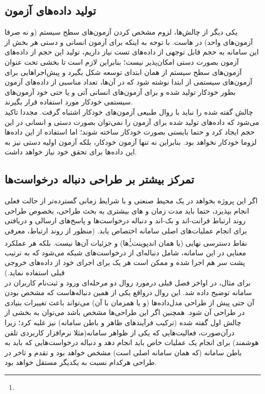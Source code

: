 \subsection{تولید داده‌های آزمون}

یکی دیگر از چالش‌ها، لزوم مشخص کردن آزمون‌های سطح سیستم (و نه صرفا آزمون‌های واحد) در هاست. با توجه به اینکه برای آزمون انسانی و دستی هر بخش از این سامانه به حجم قابل توجهی از داده‌های تست نیاز داریم، تولید این حجم از داده‌های آزمون بصورت دستی امکان‌پذیر نیست؛ بنابراین لازم است تا بخشی تحت عنوان آزمون‌های سطح سیستم از همان ابتدای توسعه شکل بگیرد و پیش‌اجراهایی برای آزمون‌های سیستمی از ابتدا نوشته شود که در آن‌ها، تعداد مناسبی از داده‌های آزمون بطور خودکار تولید شده و برای آزمون‌های انسانی آتی و یا حتی خود آزمون‌های سیستمی خودکار مورد استفاده قرار بگیرند.\\

چالش گفته شده را نباید با روال طبیعی آزمون‌های خودکار اشتباه گرفت. مجددا تاکید می‌شود که داده‌های تولید شده برای آزمون را نمی‌توان بصورت دستی و انسانی در این حجم ایجاد کرد و حتما بایستی بصورت خودکار ساخته شوند؛ اما استفاده از این داده‌ها لزوما خودکار نخواهد بود. بنابراین نه تنها آزمون خودکار، بلکه آزمون اولیه دستی نیز به این داده‌ها برای تحقق خود نیاز خواهد داشت.\\

\newpage

\subsection{تمرکز بیشتر بر طراحی دنباله درخواست‌ها}

اگر این پروژه بخواهد در یک محیط صنعتی و با شرایط زمانی گسترده‌تر از حالت فعلی انجام بپذیرد، حتما باید مدت زمان و های بیشتری به بحث طراحی، بخصوص طراحی روند ارتباط فرانت-اند و بک-اند و دنباله درخواست‌ها و پاسخ‌های ارسالی و دریافتی برای انجام عملیات‌های اصلی سامانه اختصاص یابد. (منظور از روند ارتباط، معرفی نقاط دسترسی نهایی (یا همان اندپوینت\footnote{}‌ها) و جزئیات آن‌ها نیست. بلکه هر عملکرد معنایی در این سامانه، شامل دنباله‌ای از درخواست‌های شبکه می‌شود که به ترتیب پشت سر هم اجرا شده و ممکن است هر یک برای اجرای خود از داده‌های خروجی قبلی استفاده نماید.)\\

برای مثال، در اواخر فصل قبلی درمورد روال دو مرحله‌ای ورود و ثبت‌نام کاربران در سامانه توضیح داده شد. این روال درواقع یکی از همین دنباله‌هاست که مشخص بودن آن حتی پیش از طراحی مدل‌داده‌ها (و یا همزمان با آن) می‌تواند باعث تغییرات بنیادی در طراحی آن شود. همچنین اگر این طراحی‌ها مشخص باشد می‌توان به بخشی از چالش اول گفته شده (ترکیب فرآیندهای ظاهر و باطن سامانه) نیز غلبه کرد؛ زیرا درآن‌صورت، فعالیت‌هایی که یکی از ظواهر سامانه(مثلا نرم‌افزار کاربردی تلفن هوشمند) برای انجام یک عملیات خاص باید انجام دهد و دنباله درخواست‌هایی که باید به باطن سامانه (که همان سامانه اصلی است) مشخص خواهد بود و تقدم و تاخر در طراحی هرکدام نسبت به یکدیگر مستقل خواهد بود.

